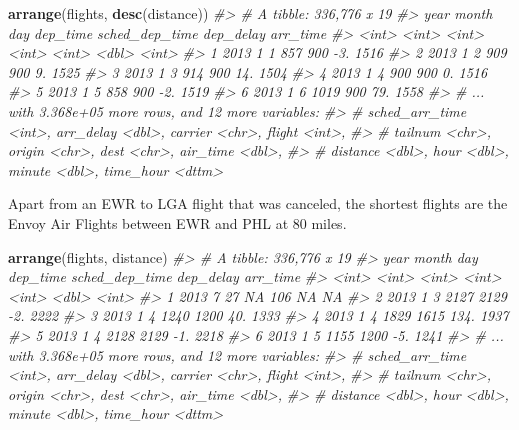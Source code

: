 \documentclass[]{book}
\newenvironment{Shaded}{\begin{snugshade}}{\end{snugshade}}
\newcommand{\CommentTok}[1]{\textcolor[rgb]{0.56,0.35,0.01}{\textit{#1}}}
\newcommand{\KeywordTok}[1]{\textcolor[rgb]{0.13,0.29,0.53}{\textbf{#1}}}
\newcommand{\NormalTok}[1]{#1}
\theoremstyle{definition}
\theoremstyle{definition}
\theoremstyle{definition}
\theoremstyle{remark}
\begin{document}
\begin{Shaded}
\begin{Highlighting}[]
\KeywordTok{arrange}\NormalTok{(flights, }\KeywordTok{desc}\NormalTok{(distance))}
\CommentTok{#> # A tibble: 336,776 x 19}
\CommentTok{#>    year month   day dep_time sched_dep_time dep_delay arr_time}
\CommentTok{#>   <int> <int> <int>    <int>          <int>     <dbl>    <int>}
\CommentTok{#> 1  2013     1     1      857            900       -3.     1516}
\CommentTok{#> 2  2013     1     2      909            900        9.     1525}
\CommentTok{#> 3  2013     1     3      914            900       14.     1504}
\CommentTok{#> 4  2013     1     4      900            900        0.     1516}
\CommentTok{#> 5  2013     1     5      858            900       -2.     1519}
\CommentTok{#> 6  2013     1     6     1019            900       79.     1558}
\CommentTok{#> # ... with 3.368e+05 more rows, and 12 more variables:}
\CommentTok{#> #   sched_arr_time <int>, arr_delay <dbl>, carrier <chr>, flight <int>,}
\CommentTok{#> #   tailnum <chr>, origin <chr>, dest <chr>, air_time <dbl>,}
\CommentTok{#> #   distance <dbl>, hour <dbl>, minute <dbl>, time_hour <dttm>}
\end{Highlighting}
\end{Shaded}

Apart from an EWR to LGA flight that was canceled, the shortest flights
are the Envoy Air Flights between EWR and PHL at 80 miles.

\begin{Shaded}
\begin{Highlighting}[]
\KeywordTok{arrange}\NormalTok{(flights, distance)}
\CommentTok{#> # A tibble: 336,776 x 19}
\CommentTok{#>    year month   day dep_time sched_dep_time dep_delay arr_time}
\CommentTok{#>   <int> <int> <int>    <int>          <int>     <dbl>    <int>}
\CommentTok{#> 1  2013     7    27       NA            106       NA        NA}
\CommentTok{#> 2  2013     1     3     2127           2129       -2.     2222}
\CommentTok{#> 3  2013     1     4     1240           1200       40.     1333}
\CommentTok{#> 4  2013     1     4     1829           1615      134.     1937}
\CommentTok{#> 5  2013     1     4     2128           2129       -1.     2218}
\CommentTok{#> 6  2013     1     5     1155           1200       -5.     1241}
\CommentTok{#> # ... with 3.368e+05 more rows, and 12 more variables:}
\CommentTok{#> #   sched_arr_time <int>, arr_delay <dbl>, carrier <chr>, flight <int>,}
\CommentTok{#> #   tailnum <chr>, origin <chr>, dest <chr>, air_time <dbl>,}
\CommentTok{#> #   distance <dbl>, hour <dbl>, minute <dbl>, time_hour <dttm>}
\end{Highlighting}
\end{Shaded}
\end{document}
